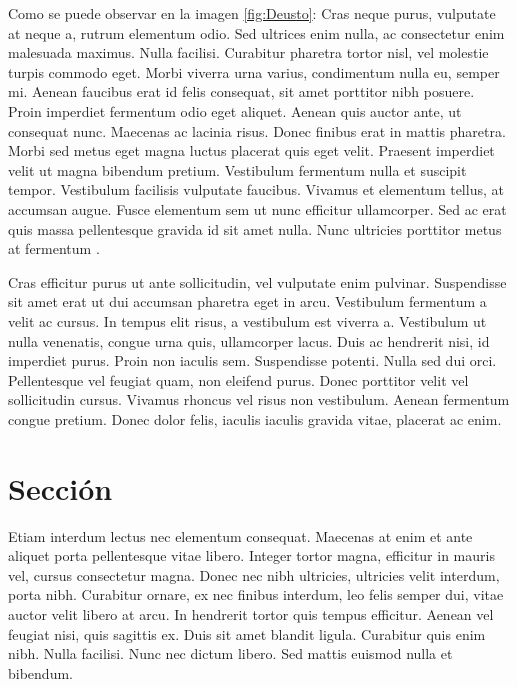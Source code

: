 \textcolor{Rojo}{Como se puede observar en la imagen \ref{fig:Deusto}}: Cras neque purus, vulputate at neque a, rutrum elementum odio. Sed ultrices enim nulla, ac consectetur enim malesuada maximus. Nulla facilisi. Curabitur pharetra tortor nisl, vel molestie turpis commodo eget. Morbi viverra urna varius, condimentum nulla eu, semper mi. Aenean faucibus erat id felis consequat, sit amet porttitor nibh posuere. Proin imperdiet fermentum odio eget aliquet. Aenean quis auctor ante, ut consequat nunc. Maecenas ac lacinia risus. Donec finibus erat in mattis pharetra. Morbi sed metus eget magna luctus placerat quis eget velit. Praesent imperdiet velit ut magna bibendum pretium. Vestibulum fermentum nulla et suscipit tempor. Vestibulum facilisis vulputate faucibus. Vivamus et elementum tellus, at accumsan augue. Fusce elementum sem ut nunc efficitur ullamcorper. Sed ac erat quis massa pellentesque gravida id sit amet nulla. Nunc ultricies porttitor metus at fermentum \cite{Deusto}.\\

\setlength{\fboxsep}{0pt}


Cras efficitur purus ut ante sollicitudin, vel vulputate enim pulvinar. Suspendisse sit amet erat ut dui accumsan pharetra eget in arcu. Vestibulum fermentum a velit ac cursus. In tempus elit risus, a vestibulum est viverra a. Vestibulum ut nulla venenatis, congue urna quis, ullamcorper lacus. Duis ac hendrerit nisi, id imperdiet purus. Proin non iaculis sem. Suspendisse potenti. Nulla sed dui orci. Pellentesque vel feugiat quam, non eleifend purus. Donec porttitor velit vel sollicitudin cursus. Vivamus rhoncus vel risus non vestibulum. Aenean fermentum congue pretium. Donec dolor felis, iaculis iaculis gravida vitae, placerat ac enim.

\section{Sección}
Etiam interdum lectus nec elementum consequat. Maecenas at enim et ante aliquet porta pellentesque vitae libero. Integer tortor magna, efficitur in mauris vel, cursus consectetur magna. Donec nec nibh ultricies, ultricies velit interdum, porta nibh. Curabitur ornare, ex nec finibus interdum, leo felis semper dui, vitae auctor velit libero at arcu. In hendrerit tortor quis tempus efficitur. Aenean vel feugiat nisi, quis sagittis ex. Duis sit amet blandit ligula. Curabitur quis enim nibh. Nulla facilisi. Nunc nec dictum libero. Sed mattis euismod nulla et bibendum.

